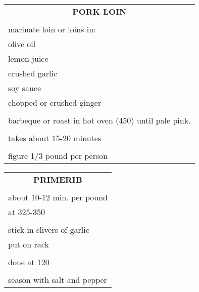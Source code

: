 \documentclass[8pt]{report}
\begin{document}
\begin{tabular}{|l|} \hline	%
 
\multicolumn{1}{|c|}{\textbf{PORK LOIN}}
\\
\\

\index{fish/meat!pork loin} \index{pork loin}

marinate loin or loins in:\\
\hspace{0.5 in}	olive oil\\
\hspace{0.5 in}	lemon juice\\
\hspace{0.5 in}	crushed garlic\\
\hspace{0.5 in}	soy sauce\\
\hspace{0.5 in}	chopped or crushed ginger\\
\\
barbeque or roast in hot oven (450) until pale pink.\\
\\
takes about 15-20 minutes\\
\\
figure 1/3 pound per person\\

\hline

\end{tabular}

\newpage

\centering

\begin{tabular}{|l|} \hline	%
 
\multicolumn{1}{|c|}{\textbf{PRIMERIB}}
\\
\\

\index{fish/meat!primerib} \index{primerib}




about 10-12 min. per pound\\
at 325-350\\
\\
stick in slivers of garlic\\
put on rack\\
\\
done at 120\\
\\
season with salt and pepper\\


\hline

\end{tabular}
\end{document}

